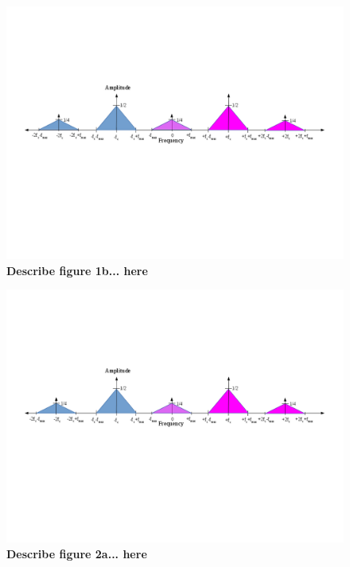 \documentclass[letterpaper,12pt]{article}
\begin{document}
\begin{figure}[ht] 
\includegraphics[width=1.0\columnwidth]{prelab1-figure1b}
\caption{
\label{fig:hw1-figure1b}
{\bf Describe figure 1b...
here}
}
\end{figure}

\begin{figure}[ht] 
\includegraphics[width=1.0\columnwidth]{prelab1-figure2a}
\caption{
\label{fig:hw1-figure2a}
{\bf Describe  figure 2a...
here}
}
\end{figure}
\end{document}
